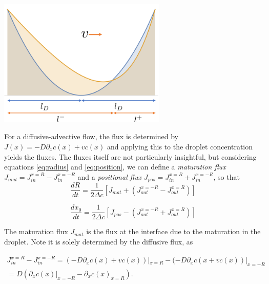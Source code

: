 \documentclass{Dissertate}
\let\origfigure\figure
\let\endorigfigure\endfigure
\renewenvironment{figure}[1][2] {
    \expandafter\origfigure\expandafter[H]
} {
    \endorigfigure
}
\begin{document}
\begin{figure}
\hypertarget{fig:concprofile}{%
\centering
\includegraphics[width=0.6\textwidth]{source/figures/png/concprofile.png}
\caption{Concentration profiles inside an active droplet for v=0 (blue)
and v\textgreater{}0 (orange). Note that the minimum concentration
increases and that its location moves right.}\label{fig:concprofile}
}
\end{figure}

For a diffusive-advective flow, the flux is determined by
\(J(x) = -D\partial_xc(x)+vc(x)\) and applying this to the droplet
concentration yields the fluxes. The fluxes itself are not particularly
insightful, but considering equations \ref{eq:radius} and
\ref{eq:position}, we can define a \emph{maturation flux}
\(J_{mat} = J_{in}^{x=R}-J_{in}^{x=-R}\) and a \emph{positional flux}
\(J_{pos} = J_{in}^{x=R}+J_{in}^{x=-R}\), so that \begin{equation}
\frac{dR}{dt}=\frac{1}{2\Delta c}\left[J_{mat}+(J_{out}^{x=-R}-J_{out}^{x=R})\right]
\label{eq:drdtalt}\end{equation}

\begin{equation}
\frac{dx_0}{dt}=\frac{1}{2\Delta c}\left[J_{pos}-(J_{out}^{x=-R}+J_{out}^{x=R})\right]
\label{eq:dxdtalt}\end{equation}

The maturation flux \(J_{mat}\) is the flux at the interface due to the
maturation in the droplet. Note it is solely determined by the diffusive
flux, as 

\begin{multline}
	J_{in}^{x=R}-J_{in}^{x=-R} = (-D\partial_xc(x)+vc(x))|_{x=R}-(-D\partial_xc(x+vc(x))|_{x=-R}\\=D(\partial_xc(x)|_{x=-R}-\partial_xc(x)_{x=R}).
\end{multline}
\end{document}
